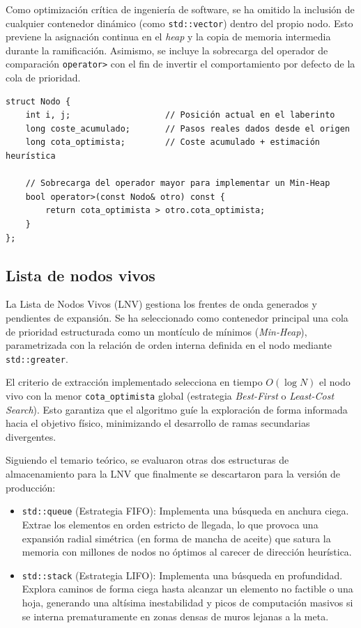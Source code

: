 \documentclass[11pt,a4paper]{article}
\begin{document}
Como optimización crítica de ingeniería de software, se ha omitido la inclusión de cualquier contenedor dinámico (como \texttt{std::vector}) dentro del propio nodo. Esto previene la asignación continua en el \textit{heap} y la copia de memoria intermedia durante la ramificación. Asimismo, se incluye la sobrecarga del operador de comparación \texttt{operator>} con el fin de invertir el comportamiento por defecto de la cola de prioridad.

\begin{lstlisting}[caption={Definición de la estructura Nodo}, label={lst:nodo}]
struct Nodo {
    int i, j;                   // Posición actual en el laberinto
    long coste_acumulado;       // Pasos reales dados desde el origen
    long cota_optimista;        // Coste acumulado + estimación heurística

    // Sobrecarga del operador mayor para implementar un Min-Heap
    bool operator>(const Nodo& otro) const {
        return cota_optimista > otro.cota_optimista;
    }
};
\end{lstlisting}

\subsection{Lista de nodos vivos}
La Lista de Nodos Vivos (LNV) gestiona los frentes de onda generados y pendientes de expansión. Se ha seleccionado como contenedor principal una cola de prioridad estructurada como un montículo de mínimos (\textit{Min-Heap}), parametrizada con la relación de orden interna definida en el nodo mediante \texttt{std::greater}.

El criterio de extracción implementado selecciona en tiempo $O(\log N)$ el nodo vivo con la menor \texttt{cota\_optimista} global (estrategia \textit{Best-First} o \textit{Least-Cost Search}). Esto garantiza que el algoritmo guíe la exploración de forma informada hacia el objetivo físico, minimizando el desarrollo de ramas secundarias divergentes.

Siguiendo el temario teórico, se evaluaron otras dos estructuras de almacenamiento para la LNV que finalmente se descartaron para la versión de producción:
\begin{itemize}
    \item \texttt{std::queue} (Estrategia FIFO): Implementa una búsqueda en anchura ciega. Extrae los elementos en orden estricto de llegada, lo que provoca una expansión radial simétrica (en forma de mancha de aceite) que satura la memoria con millones de nodos no óptimos al carecer de dirección heurística.
    \item \texttt{std::stack} (Estrategia LIFO): Implementa una búsqueda en profundidad. Explora caminos de forma ciega hasta alcanzar un elemento no factible o una hoja, generando una altísima inestabilidad y picos de computación masivos si se interna prematuramente en zonas densas de muros lejanas a la meta.
\end{itemize}
\end{document}
